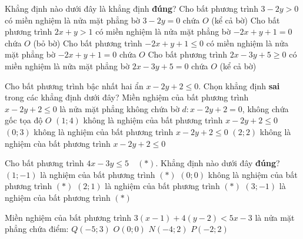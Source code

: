  \begin{ex}%
 	Khẳng định nào dưới đây là khẳng định \textbf{đúng}?
 	\choice 
 	{Cho bất phương trình $3-2 y>0$ có miền nghiệm là nửa mặt phẳng bờ $3-2 y=0$ chứa $O$ (kể cả bờ)}
 	{Cho bất phương trình $2 x+y>1$ có miền nghiệm là nửa mặt phẳng bờ $-2 x+y+1=0$ chứa $O$ (bỏ bờ)}
 	{Cho bất phương trình $-2 x+y+1 \le 0$ có miền nghiệm là nửa mặt phẳng bờ $-2 x+y+1=0$ chứa $O$}
 	{\True  Cho bất phương trình $2 x-3 y+5 \ge 0$ có miền nghiệm là nửa mặt phẳng bờ $2 x-3 y+5=0$ chứa $O$ (kể cả bờ)}
 \end{ex}
 
 \begin{ex}%
 	Cho bất phương trình bậc nhất hai ẩn $x-2 y+2 \le 0$. Chọn khẳng định \textbf{sai }trong các khẳng định dưới đây?
 	\choice 
 	{Miền nghiệm của bất phương trình $x-2 y+2 \leq 0$ là nửa mặt phẳng không chứa bờ $d\colon x-2 y+2=0$, không chứa gốc tọa độ $O$}
 	{\True $(1;4)$ không là nghiệm của bất phương trình $x-2 y+2 \leq 0$}
 	{$(0 ; 3)$ không là nghiệm của bất phương trình $x-2 y+2 \leq 0$}
 	{ $(2 ; 2)$ không là nghiệm cùa bất phương trình $x-2 y+2 \leq 0$}
 \end{ex}
 
 \begin{ex}%
 	Cho bất phương trình $4 x-3 y \le 5\quad(\ast)$. Khẳng định nào dưới đây \textbf{đúng}?
 	\choice
 	{ $(1;-1)$ là nghiệm của bất phương trình $(\ast)$}
 	{$(0 ; 0)$ không là nghiệm của bất phương trình $(\ast)$}
 	{\True $(2 ; 1)$ là nghiệm của bất phương trình $(\ast)$}
 	{$(3 ;-1)$ là nghiệm của bất phương trình $(\ast)$}
 \end{ex}
 
 \begin{ex}%
 	Miền nghiệm của bất phương trình $3(x-1)+4(y-2)<5x-3$ là nửa mặt phẳng chứa điểm:
 	\choice
 	{$Q(-5;3)$}
 	{\True $O(0;0)$}
 	{$N(-4;2)$}
 	{$P(-2;2)$}
 \end{ex}
 
